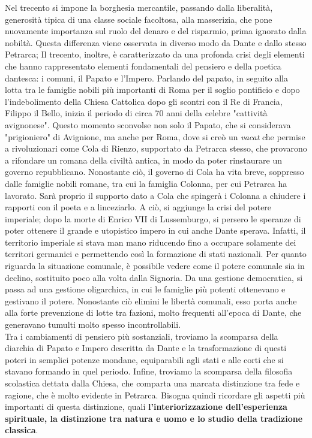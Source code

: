 \documentclass[10pt,a4paper]{article}
\begin{document}
Nel trecento si impone la borghesia mercantile, passando dalla liberalità, generosità tipica di una classe sociale facoltosa, alla masserizia, che pone nuovamente importanza sul ruolo del denaro e del risparmio, prima ignorato dalla nobiltà. Questa differenza viene osservata in diverso modo da Dante e dallo stesso Petrarca; Il trecento, inoltre, è caratterizzato da una profonda crisi degli elementi che hanno rappresentato elementi fondamentali del pensiero e della poetica dantesca: i comuni, il Papato e l'Impero. Parlando del papato, in seguito alla lotta tra le famiglie nobili più importanti di Roma per il soglio pontificio e dopo l'indebolimento della Chiesa Cattolica dopo gli scontri con il Re di Francia, Filippo il Bello, inizia il periodo di circa 70 anni della celebre "cattività avignonese". Questo momento sconvolse non solo il Papato, che si considerava "prigioniero" di Avignione, ma anche per Roma, dove si creò un \textit{vacat} che permise a rivoluzionari come Cola di Rienzo, supportato da Petrarca stesso, che provarono a rifondare un romana della civiltà antica, in modo da poter rinstaurare un governo repubblicano. Nonostante ciò, il governo di Cola ha vita breve, soppresso dalle famiglie nobili romane, tra cui la famiglia Colonna, per cui Petrarca ha lavorato. Sarà proprio il supporto dato a Cola che spingerà i Colonna a chiudere i rapporti con il poeta e a linceziarlo. A ciò, si aggiunge la crisi del potere imperiale; dopo la morte di Enrico VII di Lussemburgo, si persero le speranze di poter ottenere il grande e utopistico impero in cui anche Dante sperava. Infatti, il territorio imperiale si stava man mano riducendo fino a occupare solamente dei territori germanici e permettendo così la formazione di stati nazionali. Per quanto riguarda la situazione comunale, è possibile vedere come il potere comunale sia in declino, sostituito poco alla volta dalla Signoria. Da una gestione democratica, si passa ad una gestione oligarchica, in cui le famiglie più potenti ottenevano e gestivano il potere. Nonostante ciò elimini le libertà comunali, esso porta anche alla forte prevenzione di lotte tra fazioni, molto frequenti all'epoca di Dante, che generavano tumulti molto spesso incontrollabili.\\

Tra i cambiamenti di pensiero più sostanziali, troviamo la scomparsa della diarchia di Papato e Impero descritta da Dante e la trasformazione di questi poteri in semplici potenze mondane, equiparabili agli stati e alle corti che si stavano formando in quel periodo. Infine, troviamo la scomparsa della filosofia scolastica dettata dalla Chiesa, che comparta una marcata distinzione tra fede e ragione, che è molto evidente in Petrarca. Bisogna quindi ricordare gli aspetti più importanti di questa distinzione, quali \textbf{l'interiorizzazione dell'esperienza spirituale, la distinzione tra natura e uomo e lo studio della tradizione classica}.  
\end{document}
